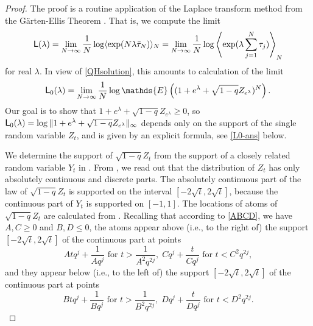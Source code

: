 \documentclass{amsart}
\theoremstyle{definition}
\theoremstyle{remark}
\theoremstyle{remark}
\theoremstyle{definition}
\numberwithin{equation}{section}
\begin{document}
\begin{proof}
The proof is a routine application of the  Laplace transform method from the G\"arten-Ellis Theorem  \cite[Theorem
2.3.6]{DZ2009}. That is, we   compute the limit
\begin{equation}
  \label{LL}
  {\mbox{\fontfamily{phv}\selectfont L}}({\lambda})=\lim_{N\to\infty}\frac1N\log \langle \exp(N {\lambda} \bar \tau_N)\rangle_N=\lim_{N\to\infty}\frac1N\log
  \left\langle \exp( {\lambda} \sum_{j=1}^N \tau_j)\right\rangle_N
\end{equation}
for real ${\lambda}$. In view of \eqref{QHsolution}, this amounts to calculation of the limit
\begin{equation}
  \label{LL0}
  {\mbox{\fontfamily{phv}\selectfont L}}_0(\lambda)=\lim_{N\to\infty}\frac1N \log {\mathds{E}}\left((1+e^{\lambda} +\sqrt{1-q} Z_{e^{\lambda}})^N \right).
\end{equation}
Our goal is to show that $1+e^{\lambda} +\sqrt{1-q} Z_{e^{\lambda}}\geq 0$, so ${\mbox{\fontfamily{phv}\selectfont L}}_0(\lambda)=\log \|1+e^{\lambda} +\sqrt{1-q}
Z_{e^{\lambda}}\|_\infty$ depends only on the support of the single random variable  $Z_t$, and is given by an explicit formula, see
\eqref{L0-ans} below.

{} We determine the support of $\sqrt{1-q}Z_t$  from   the support of a closely related random variable
$Y_t$ in \cite[(2.22)]{Bryc-Wesolowski-08}. From \cite[Section 3.2]{Bryc-Wesolowski-08}, we read out that the distribution of
$Z_t$ has only absolutely continuous and discrete parts. The absolutely continuous part of the law of $\sqrt{1-q}Z_t$ is
supported on the interval $[-2\sqrt{t},2\sqrt{t}]$, because the continuous part of $Y_t$ is supported on $[-1,1]$. The
locations of atoms of $\sqrt{1-q}Z_t$ are calculated from \cite[formulas (3.7) and (3.8)]{Bryc-Wesolowski-08}. Recalling that
according to \eqref{ABCD}, we have $A,C\geq 0$ and $B,D\leq 0$, the atoms   appear above (i.e., to the right of) the support
$[-2\sqrt{t},2\sqrt{t}]$ of the continuous part at points
$$At q^j +\frac{1}{A q^j}  \mbox{ for $t>\frac{1}{A^2 q^{2j}}$}, \; C q^j+\frac{t}{C q^j} \mbox{ for $t<C^2 q^{2j}$}, $$
and they  appear below (i.e., to the left of) the support $[-2\sqrt{t},2\sqrt{t}]$ of the continuous part  at points
$$ Bt q^j +\frac{1}{B q^j} \mbox{ for $t>\frac{1}{B^2 q^{2j}}$}, \; D q^j+\frac{t}{D q^j} \mbox{ for $t<D^2 q^{2j}$}. $$


\end{proof}
\end{document}
